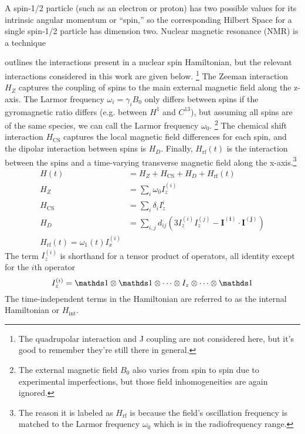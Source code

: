 A spin-1/2 particle (such as an electron or proton) has two possible values for its intrinsic angular momentum or ``spin,'' so the corresponding Hilbert Space for a single spin-1/2 particle has dimension two.
Nuclear magnetic resonance (NMR) is a technique

\cite{1976ii} outlines the interactions present in a nuclear spin Hamiltonian, but the relevant interactions considered in this work are given below.%
\footnote{The quadrupolar interaction and J coupling are not considered here, but it's good to remember they're still there in general.}
The Zeeman interaction $H_Z$ captures the coupling of spins to the main external magnetic field along the z-axis. The Larmor frequency $\omega_i = \gamma_i B_0$ only differs between spins if the gyromagnetic ratio differs (e.g. between $H^1$ and $C^{13}$), but assuming all spins are of the same species, we can call the Larmor frequency $\omega_0$.%
\footnote{The external magnetic field $B_0$ also varies from spin to spin due to experimental imperfections, but those field inhomogeneities are again ignored.}
The chemical shift interaction $H_{\text{CS}}$ captures the local magnetic field differences for each spin, and the dipolar interaction between spins is $H_D$. Finally, $H_\text{rf}(t)$ is the interaction between the spins and a time-varying transverse magnetic field along the x-axis.\footnote{The reason it is labeled as $H_\text{rf}$ is because the field's oscillation frequency is matched to the Larmor frequency $\omega_0$ which is in the radiofrequency range.}
\begin{align}\label{eq:nmr-ham}
    H(t) &= H_Z + H_\text{CS} + H_D + H_\text{rf}(t) \\
    H_Z &= \sum_i \omega_0 I_z^{(i)} \\
    H_\text{CS} &= \sum_i \delta_i I_z^i \\
    H_D &= \sum_{i,j} d_{ij} \left( 3I_z^{(i)}I_z^{(j)} - \mathbf{I^{(i)}} \cdot \mathbf{I^{(j)}} \right) \\
    H_{\text{rf}}(t) = \omega_1(t) I_x^{(i)}
\end{align}
The term $I_z^{(i)}$ is shorthand for a tensor product of operators, all identity except for the $i$th operator
\[
I_z^{(i)} = \identity \otimes \identity \otimes \dots \otimes I_z \otimes \dots \otimes \identity
\]
The time-independent terms in the Hamiltonian are referred to as the internal Hamiltonian or $H_{\text{int}}$.

